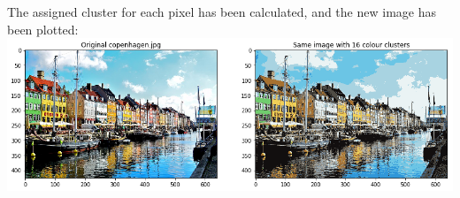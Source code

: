 The assigned cluster for each pixel has been calculated, and the new image has been plotted:\\
\includegraphics[width=\linewidth]{3c1.png}\\